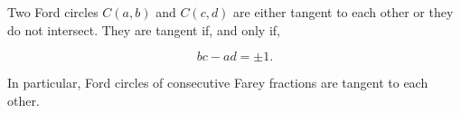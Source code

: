 Two Ford circles $C(a, b)$ and $C(c, d)$ are either tangent to each other or they do not intersect. They are tangent if, and only if,

$$bc - ad = \pm 1.$$

In particular, Ford circles of consecutive Farey fractions are tangent to each other.
